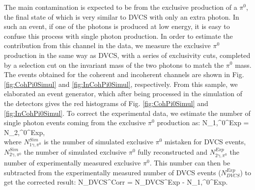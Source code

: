 \documentclass{article}
\let\oldequation\equation
\let\oldendequation\endequation
\renewenvironment{equation}
  {\linenomathNonumbers\oldequation}
  {\oldendequation\endlinenomath}
\begin{document}
The main contamination is expected to be 
from the exclusive production of a $\pi^0$, the final state of which is very similar to DVCS with 
only an extra photon. In such an event, if one of the photons is produced at low energy, it is 
easy to confuse this process with single photon production. In order to estimate the contribution from
this channel in the data, we measure the exclusive $\pi^0$ production in the same way as DVCS, with 
a series of exclusivity cuts, completed by a selection cut on the invariant mass of the two photons
to match the $\pi^0$ mass. The events obtained for the coherent and incoherent
channels are shown in Fig. \ref{fig:CohPi0Simul} and \ref{fig:InCohPi0Simul}, respectively. From 
this sample, we elaborated an event generator, which after being processed
in the simulation of the detectors gives the red histograms of Fig. \ref{fig:CohPi0Simul} and 
\ref{fig:InCohPi0Simul}. To correct the experimental data, we estimate the number of single photon 
events coming from the exclusive $\pi^0$ production as:
\begin{equation}
	N_{1\gamma,\pi^0}^{Exp} =  \times N_{2\gamma,\pi^0}^{Exp},\\
\end{equation}
where $N_{1\gamma,\pi^0}^{Sim}$ is the number of simulated exclusive $\pi^0$ mistaken for DVCS events,
$N_{2\gamma,\pi^0}^{Sim}$ the number of simulated exclusive $\pi^0$ fully reconstructed and $N_{2\gamma,\pi^0}^{Exp}$
the number of experimentally measured exclusive $\pi^0$. This number can then be subtracted from
the experimentally measured number of DVCS events ($N_{DVCS}^{Exp}$) to get the corrected result: 
\begin{equation}
	N_{DVCS}^{Corr} = N_{DVCS}^{Exp} - N_{1\gamma,\pi^0}^{Exp}.\\
\end{equation}
\end{document}
